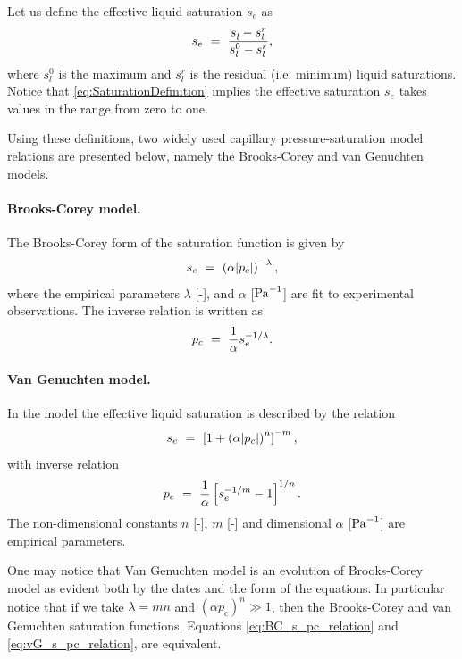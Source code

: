 Let us define the effective liquid saturation $s_e$ as
\begin{equation}
\label{eq:SaturationDefinition}
s_e \ =\  \frac{s_l^{} - s_l^r}{s_l^0 - s_l^r}, 
\end{equation}
where $s_l^0$ is the maximum and
$s_l^r$ is the residual (i.e. minimum) liquid saturations. 
Notice that \eqref{eq:SaturationDefinition} implies the effective saturation $s_e$
takes values in the range from zero to one.

Using these definitions, 
two widely used capillary pressure-saturation model relations are presented below, 
namely the Brooks-Corey \citep{brooks1964hydraulic} and van Genuchten \citep{van1980closed} 
models.


\paragraph{Brooks-Corey model.}
The Brooks-Corey form of the saturation function \citep{brooks1964hydraulic} is given by
\begin{equation}
  \label{eq:BC_s_pc_relation}
  s_e \ =\  \left( \alpha |p_c| \right)^{-\lambda}, 
\end{equation}
where the empirical parameters $\lambda$ [-], and $\alpha$ [${\rm Pa}^{-1}$] 
are fit to experimental observations.
The inverse relation is written as
\begin{equation}
  \label{eq:BC_pc_s_relation}
  p_c \ =\  \frac{1}{\alpha} s_e^{-1/\lambda}.
\end{equation}

\paragraph{Van Genuchten model.}
In the \citet{van1980closed} model the effective liquid saturation is
described by the relation
%
\begin{equation}  
  \label{eq:vG_s_pc_relation}
  s_e \ =\  \left[1+\left( \alpha |p_c| \right)^n \right]^{-m}, 
\end{equation}
%
with inverse relation
\begin{equation}
  \label{eq:vG_pc_s_relation}
  p_c \ =\  \frac{1}{\alpha} \left[ s_e^{-1/m} -1 \right]^{1/n}.
\end{equation}
%
The non-dimensional constants $n$ [-], $m$ [-] and dimensional $\alpha$ [${\rm Pa}^{-1}$] are
empirical parameters.


One may notice that Van Genuchten model is an evolution of Brooks-Corey model as evident 
both by the dates and the form of the equations.
In particular notice that if we take 
$\lambda = mn$ and $(\alpha p_c)^n \gg 1$, 
then the Brooks-Corey and van Genuchten saturation functions, 
Equations \eqref{eq:BC_s_pc_relation} and \eqref{eq:vG_s_pc_relation}, are equivalent.


